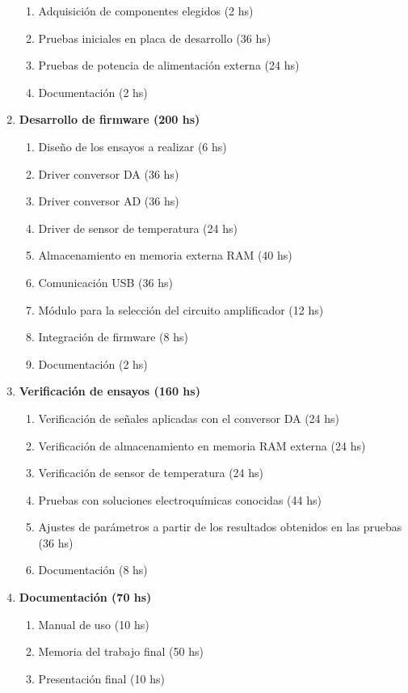 \documentclass[11pt]{charter}
\begin{document}
\begin{enumerate}
\begin{enumerate}
		\item Adquisición de componentes elegidos (2 hs)
		\item Pruebas iniciales en placa de desarrollo (36 hs)
		\item Pruebas de potencia de alimentación externa (24 hs)
		\item Documentación (2 hs)
	\end{enumerate}
\item \textbf{Desarrollo de firmware (200 hs)}
	\begin{enumerate}
		\item Diseño de los ensayos a realizar (6 hs)
		\item Driver conversor DA (36 hs)
		\item Driver conversor AD (36 hs)
		\item Driver de sensor de temperatura (24 hs)
		\item Almacenamiento en memoria externa RAM (40 hs)
		\item Comunicación USB (36 hs)
		\item Módulo para la selección del circuito amplificador (12 hs)	
		\item Integración de firmware (8 hs)
		\item Documentación (2 hs)
	\end{enumerate}		
\item \textbf{Verificación de ensayos (160 hs)}
	\begin{enumerate}
		\item Verificación de señales aplicadas con el conversor DA (24 hs)
		\item Verificación de almacenamiento en memoria RAM externa (24 hs)
		\item Verificación de sensor de temperatura (24 hs)
		\item Pruebas con soluciones electroquímicas conocidas (44 hs)
		\item Ajustes de parámetros a partir de los resultados obtenidos en las pruebas (36 hs)
		\item Documentación (8 hs)
	\end{enumerate}
\item \textbf{Documentación (70 hs)}
	\begin{enumerate}
		\item Manual de uso (10 hs)
		\item Memoria del trabajo final (50 hs)
		\item Presentación final (10 hs)
	\end{enumerate}
\end{enumerate}
\end{document}

